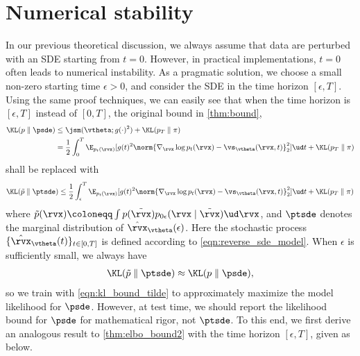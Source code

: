 \section{Numerical stability}\label{app:stability}
In our previous theoretical discussion, we always assume that data are perturbed with an SDE starting from $t=0$. However, in practical implementations, $t=0$ often leads to numerical instability. As a pragmatic solution, we choose a small non-zero starting time $\epsilon > 0$, and consider the SDE in the time horizon $[\epsilon, T]$. Using the same proof techniques, we can easily see that when the time horizon is $[\epsilon, T]$ instead of $[0, T]$, the original bound in \cref{thm:bound},
\begin{align*}
    \KL(p\mathrel\| \psde) &\leq \jsm(\vtheta; g(\cdot)^2) + \KL(p_T\mathrel\| \pi)\\
    &= \frac{1}{2} \int_{0}^T \E_{p_t(\rvx)}[g(t)^2\norm{\nabla_\rvx \log p_t(\rvx) - \vs_\vtheta(\rvx, t)}_2^2] \ud t  + \KL(p_T\mathrel\| \pi)
\end{align*}
shall be replaced with
\begin{align}
    \KL(\tilde{p}\mathrel\| \ptsde) \leq \frac{1}{2} \int_{\epsilon}^T \E_{p_t(\rvx)}[g(t)^2\norm{\nabla_\rvx \log p_t(\rvx) - \vs_\vtheta(\rvx, t)}_2^2] \ud t  + \KL(p_T\mathrel\| \pi) \label{eqn:kl_bound_tilde}
\end{align}
where $\tilde{p}(\rvx) \coloneqq \int p(\tilde{\rvx}) p_{0\epsilon}(\rvx \mid \tilde{\rvx}) \ud \rvx$, and $\ptsde$ denotes the marginal distribution of $\hat{\rvx}_\vtheta(\epsilon)$. Here the stochastic process $\{ \hat{\rvx}_\vtheta(t) \}_{t\in[0,T]}$ is defined according to \cref{eqn:reverse_sde_model}. When $\epsilon$ is sufficiently small, we always have
\begin{align*}
    \KL(\tilde{p}\mathrel\| \ptsde) \approx \KL(p\mathrel\| \psde),
\end{align*}
so we train with \cref{eqn:kl_bound_tilde} to approximately maximize the model likelihood for $\psde$. However, at test time, we should report the likelihood bound for $\psde$ for mathematical rigor, not $\ptsde$. To this end, we first derive an analogous result to \cref{thm:elbo_bound2} with the time horizon $[\epsilon, T]$, given as below.
